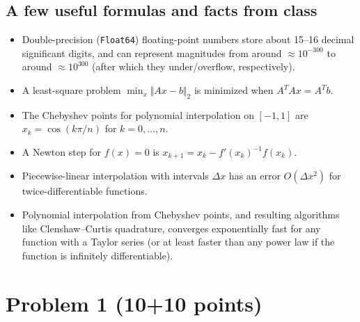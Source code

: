 \documentclass[12pt]{article}
\begin{document}
\subsection*{A few useful formulas and facts from class}
\begin{itemize}
    \item Double-precision (\texttt{Float64}) floating-point numbers store about 15--16 decimal significant digits, and can represent magnitudes from around $\approx 10^{-300}$ to around $\approx 10^{300}$ (after which they under/overflow, respectively).
    \item A least-square problem $\min_x \Vert Ax - b \Vert_2$ is minimized when $A^T A x = A^T b$.
    \item The Chebyshev points for polynomial interpolation on $[-1,1]$ are $x_k = \cos(k\pi/n)$ for $k=0,\ldots,n$.
    \item A Newton step for $f(x)=0$ is $x_{k+1} = x_k - f'(x_k)^{-1} f(x_k)$.
    \item Piecewise-linear interpolation with intervals $\Delta x$ has an error $O(\Delta x^2)$ for twice-differentiable functions.
    \item Polynomial interpolation from Chebyshev points, and resulting algorithms like Clenshaw--Curtis quadrature, converges exponentially fast for any function with a Taylor series (or at least faster than any power law if the function is infinitely differentiable).
\end{itemize}


\newpage
\section*{Problem 1 (10+10 points)}
\end{document}
